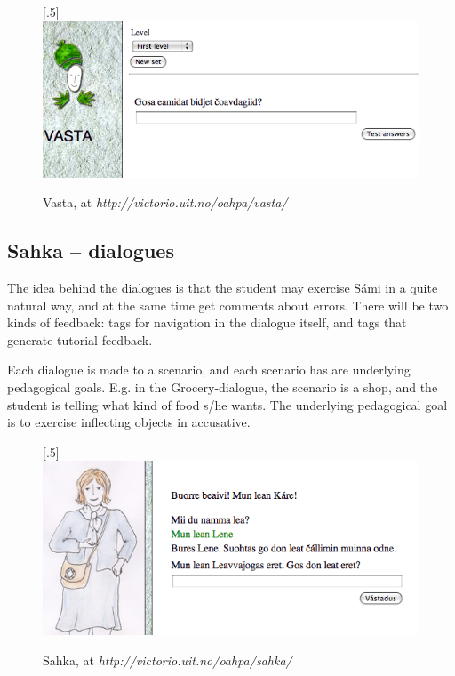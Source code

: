 \documentclass[a4paper,12pt]{article}
\begin{document}
\begin{figure}[htbp]
\begin{center}
\scalebox{.5}[.5]{\includegraphics{presentation/img/vasta.png}}\\
\caption{Vasta, at \textit{http://victorio.uit.no/oahpa/vasta/}}
\label{vasta}
\end{center}
\end{figure}

	

\subsection{Sahka -- dialogues}
The idea behind the dialogues is that the student may exercise Sámi in a quite natural way, and at the same time get comments about errors. There will be two kinds of feedback: tags for navigation in the dialogue itself, and tags that generate tutorial feedback.

Each dialogue is made to a scenario, and each scenario has are underlying pedagogical goals. E.g. in the Grocery-dialogue, the scenario is a shop, and the student is telling what kind of food s/he wants. The underlying pedagogical goal is to exercise inflecting objects in accusative.

\begin{figure}[htbp]
\begin{center}
\scalebox{.5}[.5]{\includegraphics{presentation/img/sahka2.png}}\\
\caption{Sahka, at \textit{http://victorio.uit.no/oahpa/sahka/}}
\label{sahka}
\end{center}
\end{figure}
\end{document}
